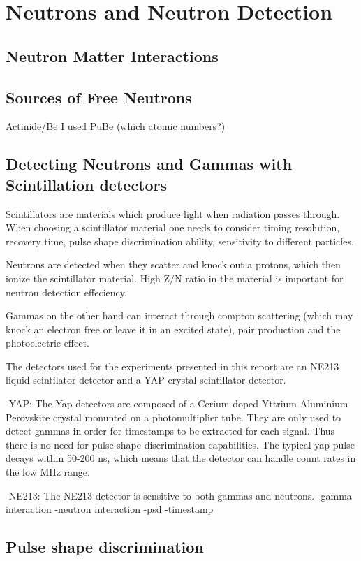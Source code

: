 \documentclass[main.tex]{subfiles}
\begin{document}
\section{Neutrons and Neutron Detection}

\subsection{Neutron Matter Interactions}

\subsection{Sources of Free Neutrons}
Actinide/Be
I used PuBe (which atomic numbers?)

\subsection{Detecting Neutrons and Gammas with Scintillation detectors}
Scintillators are materials which produce light when radiation passes through. When choosing a scintillator material one needs to consider timing resolution, recovery time, pulse shape discrimination ability, sensitivity to different particles.

Neutrons are detected when they scatter and knock out a protons, which then ionize the scintillator material. High Z/N ratio in the material is important for neutron detection effeciency.

Gammas on the other hand can interact through compton scattering (which may knock an electron free or leave it in an excited state), pair production and the photoelectric effect.

The detectors used for the experiments presented in this report are an NE213 liquid scintilator detector and a YAP crystal scintillator detector.

-YAP: The Yap detectors are composed of a Cerium doped Yttrium Aluminium Perovskite crystal monunted on a photomultiplier tube.
They are only used to detect gammas in order for timestamps to be extracted for each signal. Thus there is no need for pulse shape discrimination capabilities. The typical yap pulse decays within 50-200 ns, which means that the detector can handle count rates in the low MHz range.

-NE213: The NE213 detector is sensitive to both gammas and neutrons. 
-gamma interaction
-neutron interaction
-psd
-timestamp

\subsection{Pulse shape discrimination}
\end{document}
